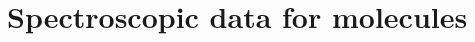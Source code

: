 \documentclass[linenumbers, twocolumn, twocolappendix, astrosymb, times]{aastex631}
\begin{document}
\section{Spectroscopic data for molecules}






{}



\end{document}
